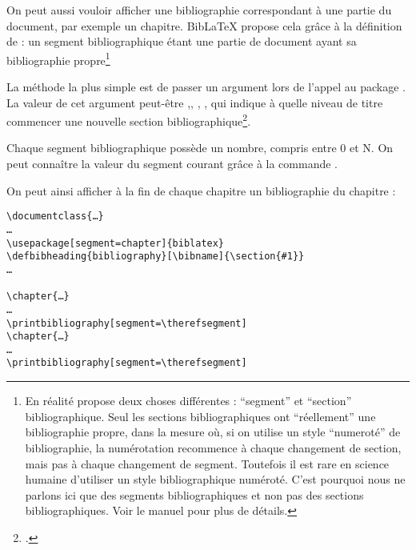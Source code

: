 On peut aussi vouloir afficher une bibliographie correspondant à une partie du document, par exemple un chapitre. BibLaTeX propose cela grâce à la définition de  : un segment bibliographique étant une partie de document ayant sa bibliographie propre\footnote{En réalité  propose deux choses différentes : \enquote{segment} et \enquote{section} bibliographique. Seul les sections bibliographiques ont \enquote{réellement} une bibliographie propre, dans la mesure où, si on utilise un style \enquote{numeroté} de bibliographie, la numérotation recommence à chaque changement de section, mais pas à chaque changement de segment. Toutefois il est rare en science humaine d'utiliser un style bibliographique numéroté. C'est pourquoi nous ne parlons ici que des segments bibliographiques et non pas des sections bibliographiques. Voir le manuel pour plus de détails.} 

La méthode la plus simple est de passer un argument  lors de l'appel au package . La valeur de cet argument peut-être ,, , , qui indique à quelle niveau de titre commencer une nouvelle section bibliographique\footcite[Il est toutefois possible de créer des sections bibliographiques autrement que suivante les niveaux de titre : voir]{exemplebibsegment}.

Chaque segment bibliographique possède un nombre, compris entre 0 et N. On peut connaître la valeur du segment courant grâce à la commande .

On peut ainsi afficher à la fin de chaque chapitre un bibliographie du chapitre :

\begin{verbatim}
\documentclass{…}
…
\usepackage[segment=chapter]{biblatex}
\defbibheading{bibliography}[\bibname]{\section{#1}}
…

\chapter{…}
…
\printbibliography[segment=\therefsegment]
\chapter{…}
…
\printbibliography[segment=\therefsegment]

\end{verbatim}

